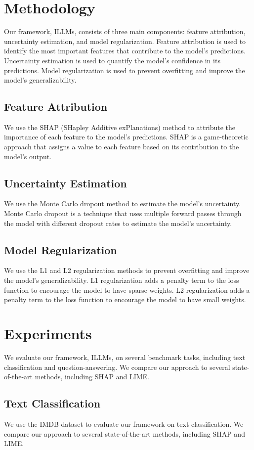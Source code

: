 \documentclass{article}
\begin{document}
\section{Methodology}
Our framework, ILLMs, consists of three main components: feature attribution, uncertainty estimation, and model regularization. Feature attribution is used to identify the most important features that contribute to the model's predictions. Uncertainty estimation is used to quantify the model's confidence in its predictions. Model regularization is used to prevent overfitting and improve the model's generalizability.

\subsection{Feature Attribution}
We use the SHAP (SHapley Additive exPlanations) method to attribute the importance of each feature to the model's predictions. SHAP is a game-theoretic approach that assigns a value to each feature based on its contribution to the model's output.

\subsection{Uncertainty Estimation}
We use the Monte Carlo dropout method to estimate the model's uncertainty. Monte Carlo dropout is a technique that uses multiple forward passes through the model with different dropout rates to estimate the model's uncertainty.

\subsection{Model Regularization}
We use the L1 and L2 regularization methods to prevent overfitting and improve the model's generalizability. L1 regularization adds a penalty term to the loss function to encourage the model to have sparse weights. L2 regularization adds a penalty term to the loss function to encourage the model to have small weights.

\section{Experiments}
We evaluate our framework, ILLMs, on several benchmark tasks, including text classification and question-answering. We compare our approach to several state-of-the-art methods, including SHAP and LIME.

\subsection{Text Classification}
We use the IMDB dataset to evaluate our framework on text classification. We compare our approach to several state-of-the-art methods, including SHAP and LIME.
\end{document}
